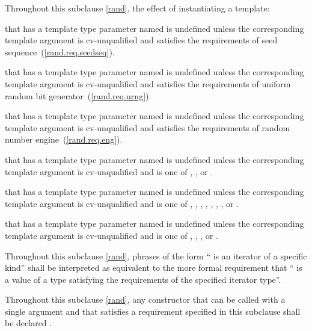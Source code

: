 \pnum
Throughout this subclause \ref{rand},
the effect of instantiating a template:
\begin{enumeratea}
  \item
    that has a template type parameter
    named 
    is undefined unless the corresponding template argument
    is cv-unqualified and
    satisfies the requirements
    of seed sequence~(\ref{rand.req.seedseq}).
  \item
    that has a template type parameter
    named 
    is undefined unless the corresponding template argument
    is cv-unqualified and
    satisfies the requirements
    of uniform random bit generator~(\ref{rand.req.urng}).
  \item
    that has a template type parameter
    named 
    is undefined unless the corresponding template argument
    is cv-unqualified and
    satisfies the requirements
    of random number engine~(\ref{rand.req.eng}).
  \item
    that has a template type parameter
    named 
    is undefined unless the corresponding template argument
    is cv-unqualified and
    is one of
    , , or .
  \item
    that has a template type parameter
    named 
    is undefined unless the corresponding template argument
    is cv-unqualified and
    is one of
      ,
      ,
      ,
      ,
      ,
      ,
      ,
      or
      .
  \item
    that has a template type parameter
    named 
    is undefined unless the corresponding template argument
    is cv-unqualified and
    is one of
      ,
      ,
      ,
      or
      .
\end{enumeratea}

\pnum
Throughout this subclause \ref{rand},
phrases of the form `` is an iterator of a specific kind''
shall be interpreted as equivalent to the more formal requirement that
`` is a value
of a type satisfying the requirements
of the specified iterator type''.

\pnum
Throughout this subclause \ref{rand},
any constructor that can be called with a single argument
and that satisfies a requirement specified in this subclause
shall be declared .

